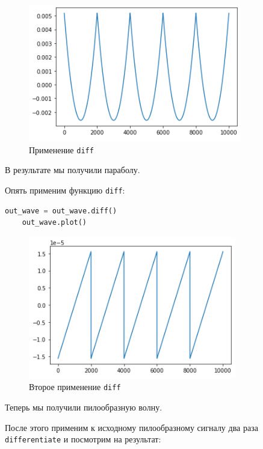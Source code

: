 \documentclass[a4paper]{article}
\begin{document}
            \begin{figure}[H]
                \centering
                \includegraphics{ex_5_2.png}
                \caption{Применение \texttt{diff}}
                \label{fig:ex_5_2}
            \end{figure}
            
            В результате мы получили параболу.
            
            Опять применим функцию \texttt{diff}:
            
\begin{lstlisting}[language=Python, caption= Второе применение \texttt{diff}]
    out_wave = out_wave.diff()
    out_wave.plot()
\end{lstlisting}
            
            \begin{figure}[H]
                \centering
                \includegraphics{ex_5_3.png}
                \caption{Второе применение \texttt{diff}}
                \label{fig:ex_5_3}
            \end{figure}
            
            Теперь мы получили пилообразную волну.
            
            После этого применим к исходному пилообразному сигналу два раза \texttt{differentiate} и посмотрим на результат:
            
\end{document}
